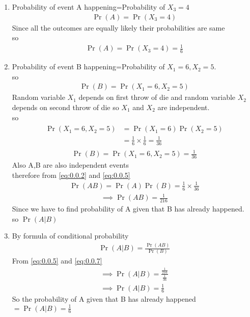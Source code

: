 \documentclass[journal,12pt,twocolumn]{IEEEtran}
\begin{document}
\begin{enumerate}
\item Probability of event A happening=Probability of $X_3=4$
\begin{align}
    \Pr{(A)}=\Pr{(X_3=4)}
\end{align}
Since all the outcomes are equally likely their probabilities are same \\
so
\begin{align}
    \Pr{(A)}=\Pr{(X_3=4)}=\frac{1}{6}
    \label{eq:0.0.2}
\end{align}
\item Probability of event B happening=Probability of $X_1=6,X_2=5$.\\
so
\begin{align}
    \Pr{(B)}=\Pr{(X_1=6,X_2=5)}
\end{align}
Random variable $X_1$ depends on first throw of die and random variable $X_2$ depends on second throw of die so $X_1$ and $X_2$ are independent.\\
so 
\begin{align}
\begin{split}
    \Pr{(X_1=6,X_2=5)} &=\Pr{(X_1=6)} \Pr{(X_2=5)}\\
   &=\frac{1}{6}\times \frac{1}{6}=\frac{1}{36}
   \end{split}
\end{align}
\begin{align}
    \Pr{(B)}=\Pr{(X_1=6,X_2=5)}=\frac{1}{36}
    \label{eq:0.0.5}
\end{align}
Also A,B are also independent events \\
therefore  from \eqref{eq:0.0.2} and \eqref{eq:0.0.5}
\begin{align}
    \Pr{(AB)} = \Pr{(A)} \Pr{(B)}
     =\frac{1}{6} \times \frac{1}{36}
    \end{align}
    \begin{align}
 \implies  \Pr{(AB)}=\frac{1}{216}\label{eq:0.0.7}
\end{align}
Since we have to find probability of A given that B has already happened.\\
so $\Pr{(A|B)}$\\
\item By formula of conditional probability
\begin{align}
    \Pr{(A|B)}=\frac{\Pr{(AB)}}{\Pr{(B)}}
    \end{align}
    From \eqref{eq:0.0.5} and \eqref{eq:0.0.7} 
    \begin{align}  
    \implies
    \Pr{(A|B)}=\frac{\frac{1}{216}}{\frac{1}{36}}\\
    \implies
    \Pr{(A|B)}=\frac{1}{6}
    \end{align}
    So the probability of A given that B has already happened $=\Pr{(A|B)}=\frac{1}{6}$
\end{enumerate}
\end{document}
